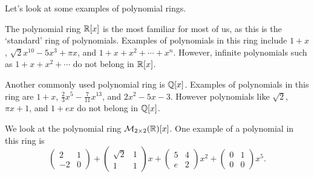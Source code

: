 Let's look at some examples of polynomial rings.
\begin{example}
    The polynomial ring $\mathbb{R}[x]$ is the most familiar for most of us, as this is the `standard' ring of polynomials. Examples of polynomials in this ring include $1+x$, $\sqrt2x^{10} - 5x^3 + \pi x$, and $1+x+x^2+\cdots+x^n$. However, infinite polynomials such as $1+x+x^2+\cdots$ do not belong in $\mathbb{R}[x]$.
\end{example}
\begin{example}
    Another commonly used polynomial ring is $\mathbb{Q}[x]$. Examples of polynomials in this ring are $1+x$, $\frac23x^5 - \frac7{11}x^{13}$, and $2x^2-5x-3$. However polynomials like $\sqrt2$, $\pi x + 1$, and $1+ex$ do not belong in $\mathbb{Q}[x]$.
\end{example}
\begin{example}
    We look at the polynomial ring $\mathcal{M}_{2\times2}(\mathbb{R})[x]$. One example of a polynomial in this ring is
    \[
        \begin{pmatrix}2&1\\-2&0\end{pmatrix} + \begin{pmatrix}\sqrt2&1\\1&1\end{pmatrix}x + \begin{pmatrix}5&4\\e&2\end{pmatrix}x^2 + \begin{pmatrix}0&1\\0&0\end{pmatrix}x^5.
    \]
\end{example}

